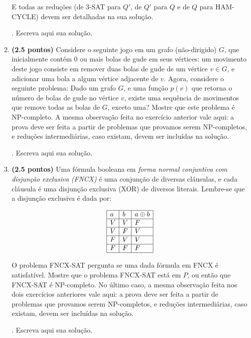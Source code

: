 \documentclass[12pt]{article}
\newcommand{\resposta}[1]{ \noindent {\bf Solução}.{\color{blue} #1}}
\begin{document}
\begin{enumerate}
E todas as reduções (de 3-SAT para $Q'$, de $Q'$ para $Q$ e de $Q$ para HAM-CYCLE) devem ser detalhadas na sua solução.

\resposta{
    Escreva aqui sua solução.
  }
  
\item {\bf (2.5 pontos)} Considere o seguinte jogo em um grafo
  (não-dirigido) $G$, que inicialmente contém 0 ou mais bolas de gude
  em seus vértices: um movimento deste jogo consiste em remover duas
  bolas de gude de um vértice $v\in G$, e adicionar uma bola a algum
  vértice adjacente de $v$. Agora, considere o seguinte problema: Dado
  um grafo $G$, e uma função $p(v)$ que retorna o número de bolas de
  gude no vértice $v$, existe uma sequência de movimentos que remove
  todas as bolas de $G$, exceto uma? Mostre que este problema é
  NP-completo. A mesma observação feita no exercício anterior vale
  aqui: a prova deve ser feita a partir de problemas que provamos
  serem NP-completos, e reduções intermediárias, caso existam, devem
  ser incluídas na solução.

  \resposta{
    Escreva aqui sua solução.
  }
  
\item {\bf (2.5 pontos)} Uma fórmula booleana em {\it forma normal conjuntiva com disjunção exclusiva (FNCX)} é uma conjunção de diversas cláusulas, e cada cláusula é uma disjunção exclusiva (XOR) de diversos literais. Lembre-se que a disjunção exclusiva é dada por:

  $$\begin{array}{|l|l|l|}\hline
      a & b & a \oplus b \\ \hline
      V & V & F \\ \hline
      V & F & V \\ \hline
      F & V & V \\ \hline
      F & F & F \\ \hline
  \end{array}$$

  O problema FNCX-SAT pergunta se uma dada fórmula em FNCX é
  satisfatível. Mostre que o problema FNCX-SAT está em $P$, ou então
  que FNCX-SAT é NP-completo. No último caso, a mesma observação feita
  nos dois exercícios anteriores vale aqui: a prova deve ser feita a
  partir de problemas que provamos serem NP-completos, e reduções
  intermediárias, caso existam, devem ser incluídas na solução.

  \resposta{
    Escreva aqui sua solução.
  }
\end{enumerate}
\end{document}
